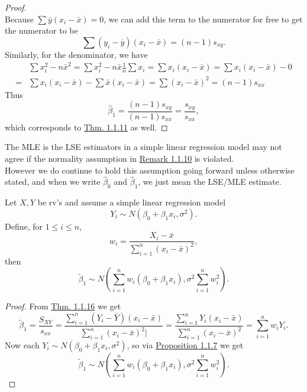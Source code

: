 \documentclass[11pt,fleqn]{book} %
\begin{document}
\begin{proof}
\[\]
\indent Because \(\sum\bar{y}(x_i - \bar{x}) = 0\), we can add this term to the numerator for free to get the numerator to be
\[
\sum(y_i - \bar{y})(x_i - \bar{x}) = (n - 1)s_{xy}.
\]
\indent Similarly, for the denominator, we have
\[
\begin{aligned}
&\sum x_i^2 - n\bar{x}^2 = \sum x_i^2 - n\bar{x}\frac1n\sum x_i = \sum x_i(x_i - \bar{x}) = \sum x_i(x_i - \bar{x}) - 0 \\
= &\sum x_i(x_i - \bar{x}) - \sum\bar{x}(x_i - \bar{x}) = \sum(x_i - \bar{x})^2 = (n - 1)s_{xx}
\end{aligned}
\]
\indent Thus 
\[
\hat{\beta}_1 = \frac{(n - 1)s_{xy}}{(n - 1)s_{xx}} = \frac{s_{xy}}{s_{xx}},
\]
which corresponds to \hyperref[thm:1111]{Thm. 1.1.11} as well.
\end{proof}

\begin{remark} \label{rmk:1117}
The MLE is the LSE estimators in a simple linear regression model may not agree if the normality assumption in \hyperref[rmk:1110]{Remark 1.1.10} is violated. \\
\indent However we do continue to hold this assumption going forward unless otherwise stated, and when we write \(\hat{\beta}_0\) and \(\hat{\beta}_1\), we just mean the LSE/MLE estimate.
\end{remark}

\begin{proposition} \label{prop:1118}
Let \(X, Y\) be rv's and assume a simple linear regression model
\[
Y_i \sim N(\beta_0 + \beta_1x_i, \sigma^2).
\]
Define, for \(1 \leq i \leq n\),
\[
w_i = \frac{X_i - \bar{x}}{\sum_{i=1}^n(x_i - \bar{x})^2},
\]
then
\[
\tilde{\beta}_1 \sim N\left(\sum_{i=1}^n w_i(\beta_0 + \beta_1x_i), \sigma^2\sum_{i=1}^n w_i^2\right).
\]
\end{proposition}
\begin{proof} From \hyperref[thm:1116]{Thm. 1.1.16} we get
\[
\tilde{\beta}_1 = \frac{S_{XY}}{s_{xx}} = \frac{\sum_{i=1}^n(Y_i - \bar{Y})(x_i - \bar{x})}{\sum_{i=1}^n(x_i - \bar{x})^2|} = \frac{\sum_{i=1}^n Y_i(x_i - \bar{x})}{\sum_{i=1}^n(x_i - \bar{x})^2} = \sum_{i=1}^n w_iY_i.
\]
\indent Now each \(Y_i \sim N(\beta_0 + \beta_1x_i, \sigma^2)\), so via \hyperref[prop:117]{Proposition 1.1.7} we get
\[
\tilde{\beta}_1 \sim N\left(\sum_{i=1}^nw_i(\beta_0 + \beta_1x_i), \sigma^2\sum_{i=1}^n w_i^2\right).
\]
\end{proof}
\end{document}

